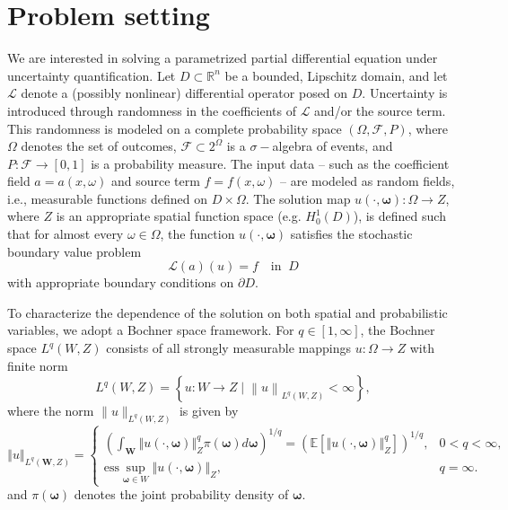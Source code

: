 \section{Problem setting}\label{sec:Problem_setting}
We are interested in solving a parametrized partial differential equation under uncertainty quantification. Let $D\subset \mathbb{R}^n$ be a bounded, Lipschitz domain, and let $\mathcal{L}$ denote a (possibly nonlinear) differential operator posed on $D$. Uncertainty is introduced through randomness in the coefficients of $\mathcal{L}$ and/or the source term. This randomness is modeled on a complete probability space $(\Omega, \mathcal{F}, P)$, where $\Omega$ denotes the set of outcomes, $\mathcal{F}\subset 2^{\Omega}$ is a $\sigma-$algebra of events, and $P:\mathcal{F}\rightarrow [0,1]$ is a probability measure. The input data -- such as the coefficient field $a=a(x, \omega)$ and source term $f = f(x, \omega)$ -- are modeled as random fields, i.e., measurable functions defined on $D\times \Omega$. The solution map $u(\cdot, \boldsymbol{\omega}): \Omega \to Z$, where $Z$ is an appropriate spatial function space (e.g. $H_0^1(D)$), is defined such that for almost every $\omega\in \Omega$, the function $u(\cdot, \boldsymbol{\omega})$ satisfies the stochastic boundary value problem
%
\begin{equation}\label{eq:Problem}
    \mathcal{L}(a)(u) = f \quad \text{in} \;\; D
\end{equation}
%
with appropriate boundary conditions on $\partial D$.

To characterize the dependence of the solution on both spatial and probabilistic variables, we adopt a Bochner space framework. For $q\in [1,\infty]$, the Bochner space $L^q(W,Z)$ consists of all strongly measurable mappings $u:\Omega\rightarrow Z$ with finite norm
%
\[
L^q(W,Z) = \left\{u:W\rightarrow Z\; \bigg\vert \;\left\|u\right\|_{L^q(W,Z)}<\infty\right\},
\]
%
where the norm $\|u\|_{L^q(W,Z)}$ is given by
%
\[
\left\Vert u \right\Vert_{L^q(\boldsymbol W,Z)} =\left\{\begin{array}{lll}
     \left(\int_{\boldsymbol W} \left\Vert u(\cdot,\boldsymbol{\omega})  \right\Vert_{Z}^q \pi(\boldsymbol{\omega})d\boldsymbol{\omega} \right)^{1/q} = \left(\mathbb{E}\left[\left\Vert u(\cdot,\boldsymbol{\omega})  \right\Vert_{Z}^q\right]\right)^{1/q}, & 0<q<\infty, \\
     \text{ess} \sup_{\boldsymbol{\omega}\in W}\left\Vert u(\cdot,\boldsymbol{\omega})  \right\Vert_{Z}, & q=\infty.
\end{array}
\right.
\]
and $\pi(\boldsymbol{\omega})$ denotes the joint probability density of $\boldsymbol{\omega}$.

